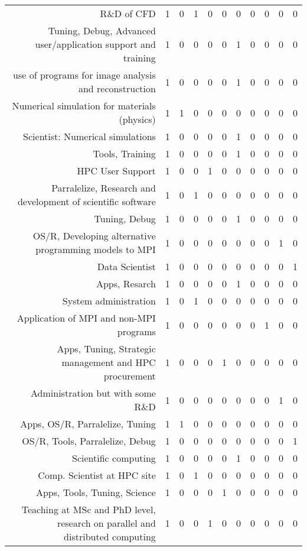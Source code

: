 {\begin{landscape}
\begin{longtable}[htb]{r|c|c|c|c|c|c|c|c|c|c}
{R\&D of CFD} & 1 & 0 & 1 & 0 & 0 & 0 & 0 & 0 & 0 & 0 \\%
{Tuning, Debug, Advanced user/application support and training} & 1 & 0 & 0 & 0 & 0 & 1 & 0 & 0 & 0 & 0 \\%
{use of programs for image analysis and reconstruction} & 1 & 0 & 0 & 0 & 0 & 1 & 0 & 0 & 0 & 0 \\%
{Numerical simulation for materials (physics)} & 1 & 1 & 0 & 0 & 0 & 0 & 0 & 0 & 0 & 0 \\%
{Scientist: Numerical simulations} & 1 & 0 & 0 & 0 & 0 & 1 & 0 & 0 & 0 & 0 \\%
{Tools, Training} & 1 & 0 & 0 & 0 & 0 & 1 & 0 & 0 & 0 & 0 \\%
{HPC User Support} & 1 & 0 & 0 & 1 & 0 & 0 & 0 & 0 & 0 & 0 \\%
{Parralelize, Research and development of scientific software} & 1 & 0 & 1 & 0 & 0 & 0 & 0 & 0 & 0 & 0 \\%
{Tuning, Debug} & 1 & 0 & 0 & 0 & 0 & 1 & 0 & 0 & 0 & 0 \\%
{OS/R, Developing alternative programming models to MPI} & 1 & 0 & 0 & 0 & 0 & 0 & 0 & 0 & 1 & 0 \\%
{Data Scientist} & 1 & 0 & 0 & 0 & 0 & 0 & 0 & 0 & 0 & 1 \\%
{Apps, Resarch} & 1 & 0 & 0 & 0 & 0 & 1 & 0 & 0 & 0 & 0 \\%
{System administration} & 1 & 0 & 1 & 0 & 0 & 0 & 0 & 0 & 0 & 0 \\%
{Application of MPI and non-MPI programs} & 1 & 0 & 0 & 0 & 0 & 0 & 0 & 1 & 0 & 0 \\%
{Apps, Tuning, Strategic management and HPC procurement} & 1 & 0 & 0 & 0 & 1 & 0 & 0 & 0 & 0 & 0 \\%
{Administration but with some R\&D} & 1 & 0 & 0 & 0 & 0 & 0 & 0 & 0 & 1 & 0 \\%
{Apps, OS/R, Parralelize, Tuning} & 1 & 1 & 0 & 0 & 0 & 0 & 0 & 0 & 0 & 0 \\%
{OS/R, Tools, Parralelize, Debug} & 1 & 0 & 0 & 0 & 0 & 0 & 0 & 0 & 0 & 1 \\%
{Scientific computing} & 1 & 0 & 0 & 0 & 0 & 1 & 0 & 0 & 0 & 0 \\%
{Comp. Scientist at HPC site} & 1 & 0 & 1 & 0 & 0 & 0 & 0 & 0 & 0 & 0 \\%
{Apps, Tools, Tuning, Science} & 1 & 0 & 0 & 0 & 1 & 0 & 0 & 0 & 0 & 0 \\%
{Teaching at MSc and PhD level, research on parallel and distributed computing} & 1 & 0 & 0 & 1 & 0 & 0 & 0 & 0 & 0 & 0 \\%

\end{longtable}
\end{landscape}}
